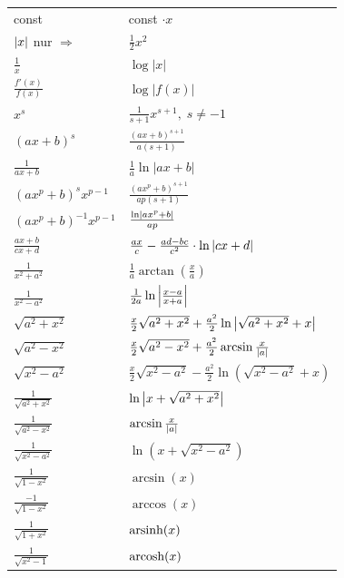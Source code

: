 \documentclass[a4paper]{article}
\begin{document}
\begin{appendix}
\begin{fmerke}
\begin{multicols}{2}
\begin{tabular}{l|l}
					const                       &   const $\cdot x$\\
					$\left|x\right|$ nur $\Rightarrow$	& $\frac{1}{2} x^2$\\
					$\frac{1}{x}$            &  $\log{\left|x\right|}$ \\
					$\frac{f'(x)}{f(x)}$            &  $\log{\left|f(x)\right|}$ \\
					$x^s $            &  $\frac{1}{s+1}x^{s+1}, \; s \ne -1$ \\
					$(ax+b)^s$            &  $\frac{(ax+b)^{s+1}}{a(s+1)}$ \\
					$\frac{1}{ax+b}$            &  $\frac{1}{a}\ln{\left|ax+b\right|}$ \\
					$(ax^p+b)^s x^{p-1}$            &  $\frac{(ax^p+b)^{s+1}}{ap(s+1)}$ \\
					$(ax^p+b)^{-1} x^{p-1}$            &  $ \frac{\ln\left|ax^p+b\right|}{ap}$ \\
					$\frac{ax+b}{cx+d}$            &  $\frac{ax}{c}-\frac{ad-bc}{c^2}\cdot\ln\left|cx+d\right|$ \\
					$\frac{1}{x^2+a^2}$            &  $\frac{1}{a}\arctan{\left(\frac{x}{a}\right)}$ \\
					$\frac{1}{x^2-a^2}$            &  $\frac{1}{2a}\ln\left|\frac{x-a}{x+a}\right|$ \\

					$\sqrt{a^2+x^2}$            &  $\frac{x}{2}\sqrt{a^2+x^2}+\frac{a^2}{2}\ln\left|\sqrt{a^2+x^2}+x\right|$ \\
					$\sqrt{a^2-x^2}$            &  $\frac{x}{2}\sqrt{a^2-x^2}+\frac{a^2}{2}\arcsin{\frac{x}{\left|a\right|}}$ \\
					$\sqrt{x^2-a^2}$            &  $\frac{x}{2}\sqrt{x^2-a^2}-\frac{a^2}{2}\ln{\left(\sqrt{x^2-a^2}+x\right)}$ \\
					$\frac{1}{\sqrt{a^2+x^2}}$            &  $\ln\left|x+\sqrt{a^2+x^2}\right|$ \\
					$\frac{1}{\sqrt{a^2-x^2}}$            &  $\arcsin{\frac{x}{\left|a\right|}}$ \\
					$\frac{1}{\sqrt{x^2-a^2}}$            &  $\ln{\left(x+\sqrt{x^2-a^2}\right)}$ \\
					$\frac{1}{\sqrt{1-x^2}}$            &  $\arcsin(x)$ \\
					$\frac{-1}{\sqrt{1-x^2}}$            &  $\arccos(x)$ \\
					$\frac{1}{\sqrt{1+x^2}}$            &  $\text{arsinh}(x)$ \\
					$\frac{1}{\sqrt{x^2-1}}$            &  $\text{arcosh}(x)$ \\


\end{tabular}
\end{multicols}
\end{fmerke}
\end{appendix}
\end{document}
